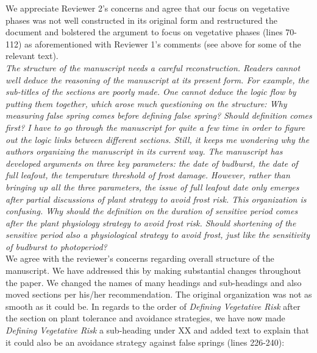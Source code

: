\documentclass[11pt,a4paper]{article}
\begin{document}
We appreciate Reviewer 2's concerns and agree that our focus on vegetative phases was not well constructed in its original form and restructured the document and bolstered the argument to focus on vegetative phases (lines 70-112) as aforementioned with Reviewer 1's comments (see above for some of the relevant text).\\


\textit{The structure of the manuscript needs a careful reconstruction. Readers cannot well deduce the reasoning of the manuscript at its present form. For example, the sub-titles of the sections are poorly made. One cannot deduce the logic flow by putting them together, which arose much questioning on the structure: Why measuring false spring comes before defining false spring? Should definition comes first? I have to go through the manuscript for quite a few time in order to figure out the logic links between different sections. Still, it keeps me wondering why the authors organizing the manuscript in its current way. The manuscript has developed arguments on three key parameters: the date of budburst, the date of full leafout, the temperature threshold of frost damage. However, rather than bringing up all the three parameters, the issue of full leafout date only emerges after partial discussions of plant strategy to avoid frost risk. This organization is confusing. Why should the definition on the duration of sensitive period comes after the plant physiology strategy to avoid frost risk. Should shortening of the sensitive period also a physiological strategy to avoid frost, just like the sensitivity of budburst to photoperiod? } \\

We agree with the reviewer's concerns regarding overall structure of the manuscript. We have addressed this by making substantial changes throughout the paper. We changed the names of many headings and sub-headings and also moved sections per his/her recommendation. The original organization was not as smooth as it could be. In regards to the order of \textit{Defining Vegetative Risk} after the section on plant tolerance and avoidance strategies, we have now made \textit{Defining Vegetative Risk} a sub-heading under XX and added text to explain that it could also be an avoidance strategy against false springs (lines 226-240): \\
\end{document}
